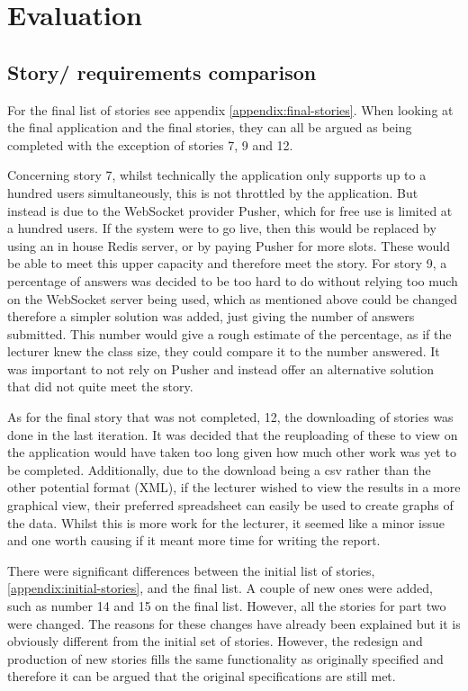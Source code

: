 \chapter{Evaluation}
\section{Story/ requirements comparison}
For the final list of stories see appendix \ref{appendix:final-stories}. When looking at the final application and the final stories, they can all be argued as being completed with the exception of stories 7, 9 and 12. 

Concerning story 7, whilst technically the application only supports up to a hundred users simultaneously, this is not throttled by the application. But instead is due to the WebSocket provider Pusher, which for free use is limited at a hundred users. If the system were to go live, then this would be replaced by using an in house Redis server, or by paying Pusher for more slots. These would be able to meet this upper capacity and therefore meet the story. For story 9, a percentage of answers was decided to be too hard to do without relying too much on the WebSocket server being used, which as mentioned above could be changed therefore a simpler solution was added, just giving the number of answers submitted. This number would give a rough estimate of the percentage, as if the lecturer knew the class size, they could compare it to the number answered. It was important to not rely on Pusher and instead offer an alternative solution that did not quite meet the story.

As for the final story that was not completed, 12, the downloading of stories was done in the last iteration. It was decided that the reuploading of these to view on the application would have taken too long given how much other work was yet to be completed. Additionally, due to the download being a csv rather than the other potential format (XML), if the lecturer wished to view the results in a more graphical view, their preferred spreadsheet can easily be used to create graphs of the data. Whilst this is more work for the lecturer, it seemed like a minor issue and one worth causing if it meant more time for writing the report.

There were significant differences between the initial list of stories, \ref{appendix:initial-stories}, and the final list. A couple of new ones were added, such as number 14 and 15 on the final list. However, all the stories for part two were changed. The reasons for these changes have already been explained but it is obviously different from the initial set of stories. However, the redesign and production of new stories fills the same functionality as originally specified and therefore it can be argued that the original specifications are still met.

